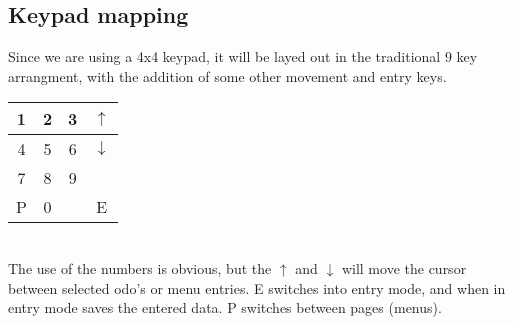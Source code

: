 \documentclass[letterpaper,11pt]{article}
\begin{document}
\subsection{Keypad mapping}
Since we are using a 4x4 keypad, it will be layed out in the traditional 9 key arrangment, with the addition of some other movement and entry keys. \\
\begin{tabular}{| c | c | c | c |}
\hline
1&2&3&$\uparrow$\\
\hline
4&5&6&$\downarrow$\\
\hline
7&8&9&\\
\hline
P&0& &E\\
\hline
\end{tabular}\\

\noindent{}The use of the numbers is obvious, but the $\uparrow$ and $\downarrow$ will move the cursor between selected odo's or menu entries. E switches into entry mode, and when in entry mode saves the entered data. P switches between pages (menus).

\end{document}
